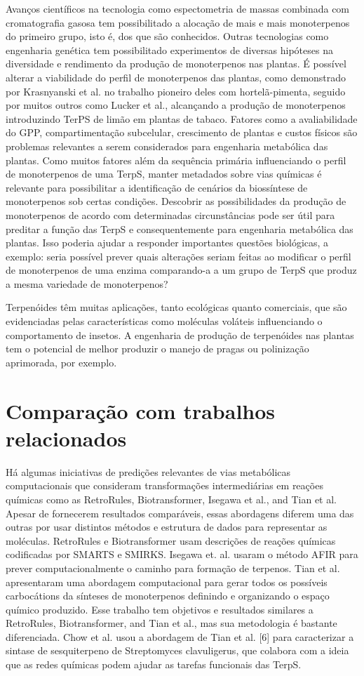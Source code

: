 Avanços científicos na tecnologia como espectometria de massas combinada com cromatografia gasosa tem possibilitado a alocação de mais e mais monoterpenos do primeiro grupo, isto é, dos que são conhecidos. Outras tecnologias como engenharia genética tem possibilitado experimentos de diversas hipóteses na diversidade e rendimento da produção de monoterpenos nas plantas. É possível alterar a viabilidade do perfil de monoterpenos das plantas, como demonstrado por  Krasnyanski et al. no trabalho pioneiro deles com hortelã-pimenta, seguido por muitos outros como Lucker et
al., alcançando a produção de monoterpenos introduzindo TerPS de limão em plantas de tabaco. Fatores como a avaliabilidade do GPP, compartimentação subcelular, crescimento de plantas e custos físicos são problemas relevantes a serem considerados para engenharia metabólica das plantas. Como muitos fatores além da sequência primária influenciando o perfil de monoterpenos de uma TerpS, manter metadados sobre vias químicas é relevante para possibilitar a identificação de cenários da biossíntese de monoterpenos sob certas condições. Descobrir as possibilidades da produção de monoterpenos de acordo com determinadas circunstâncias pode ser útil para preditar a função das TerpS e consequentemente para engenharia metabólica das plantas.  Isso poderia ajudar a responder importantes questões biológicas, a exemplo: seria possível prever quais alterações seriam feitas ao modificar o perfil de monoterpenos de uma enzima comparando-a a um grupo de TerpS que produz a mesma variedade de monoterpenos? 


Terpenóides têm muitas aplicações, tanto ecológicas quanto comerciais, que são evidenciadas pelas características como moléculas voláteis influenciando o comportamento de insetos. 
A engenharia de produção de terpenóides nas plantas tem o potencial de melhor produzir o manejo de pragas ou polinização aprimorada, por exemplo. 

\section{Comparação com trabalhos relacionados}

Há algumas iniciativas de predições relevantes de vias metabólicas computacionais que consideram transformações intermediárias em reações químicas como  as RetroRules, Biotransformer, Isegawa et al., and Tian et al. Apesar de fornecerem resultados comparáveis, essas abordagens diferem uma das outras por usar distintos métodos e estrutura de dados para representar as moléculas. RetroRules e Biotransformer usam descrições de reações químicas codificadas por SMARTS e SMIRKS. Isegawa et. al. usaram o método AFIR para prever computacionalmente o caminho para formação de terpenos. Tian et al. apresentaram uma abordagem computacional para gerar todos os possíveis carbocátions da sínteses de monoterpenos definindo e organizando o espaço químico produzido. Esse trabalho tem objetivos e resultados similares a RetroRules, Biotransformer, and Tian et al., mas sua metodologia é bastante diferenciada. Chow et al. usou a abordagem de Tian et al. [6] para caracterizar a sintase de sesquiterpeno de Streptomyces clavuligerus, que colabora com a ideia que as redes químicas podem ajudar as tarefas funcionais das TerpS.


